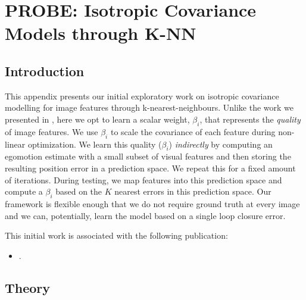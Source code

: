 \chapter{PROBE: Isotropic Covariance Models through K-NN}
\label{app:appendix_probe_knn}

\section{Introduction}

This appendix presents our initial exploratory work on isotropic covariance modelling for image features through k-nearest-neighbours. 
Unlike the work we presented in , here we opt to learn a scalar weight, $\beta_i$, that represents the \textit{quality} of image features. We use $\beta_i$ to scale the covariance of each feature during non-linear optimization. 
We learn this quality ($\beta_i$) \textit{indirectly} by computing an egomotion estimate with a small subset of visual features and then storing the resulting position error in a prediction space. We repeat this for a fixed amount of iterations. During testing, we map features into this prediction space and compute a $\beta_i$ based on the $K$ nearest errors in this prediction space. Our framework is flexible enough that we do not require ground truth at every image and we can, potentially, learn the model based on a single loop closure error. 

This initial work is associated with the following publication:
\begin{itemize}
\item {}.	
\end{itemize}


\section{Theory}

